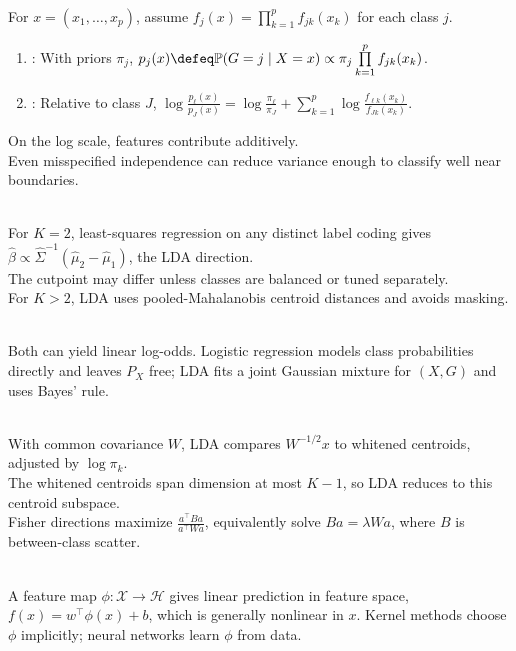 \begin{definition} \label{def:sl-naive-bayes-classifier} \\
For $x=(x_1,\ldots,x_p)$, assume $f_j(x)=\prod\limits_{k=1}^{p}f_{jk}(x_k)$ for each class $j$.
\begin{enumerate}[label=(\roman*)]
\setlength{\itemsep}{0pt}
\item {}: With priors $\pi_j$, $p_j(x)\defeq\mathbb{P}(G=j\mid X=x)\propto\pi_j\prod\limits_{k=1}^{p}f_{jk}(x_k)$.
\item {}: Relative to class $J$, $\log\frac{p_\ell(x)}{p_J(x)}=\log\frac{\pi_\ell}{\pi_J}+\sum\limits_{k=1}^{p}\log\frac{f_{\ell k}(x_k)}{f_{Jk}(x_k)}$.
\end{enumerate}
On the log scale, features contribute additively.\\
Even misspecified independence can reduce variance enough to classify well near boundaries.
\end{definition}

\begin{remark} \label{rem:sl-least-squares-versus-lda} \\
For $K=2$, least-squares regression on any distinct label coding gives $\widehat{\beta}\propto\widehat{\Sigma}^{-1}(\widehat{\mu}_2-\widehat{\mu}_1)$, the LDA direction.\\
The cutpoint may differ unless classes are balanced or tuned separately.\\
For $K>2$, LDA uses pooled-Mahalanobis centroid distances and avoids masking.
\end{remark}

\begin{remark} \label{rem:sl-logistic-versus-lda} \\
Both can yield linear log-odds. Logistic regression models class probabilities directly and leaves $P_X$ free; LDA fits a joint Gaussian mixture for $(X,G)$ and uses Bayes' rule.
\end{remark}

\begin{remark} \label{rem:sl-lda-whitening-and-reduced-rank-view} \\
With common covariance $W$, LDA compares $W^{-1/2}x$ to whitened centroids, adjusted by $\log\pi_k$.\\
The whitened centroids span dimension at most $K-1$, so LDA reduces to this centroid subspace.\\
Fisher directions maximize $\frac{a^\top Ba}{a^\top Wa}$, equivalently solve $Ba=\lambda Wa$, where $B$ is between-class scatter.
\end{remark}

\begin{remark} \label{rem:sl-feature-maps-linear-models} \\
A feature map $\phi:\mathcal{X}\to\mathcal{H}$ gives linear prediction in feature space, $f(x)=w^\top\phi(x)+b$, which is generally nonlinear in $x$. Kernel methods choose $\phi$ implicitly; neural networks learn $\phi$ from data.
\end{remark}
